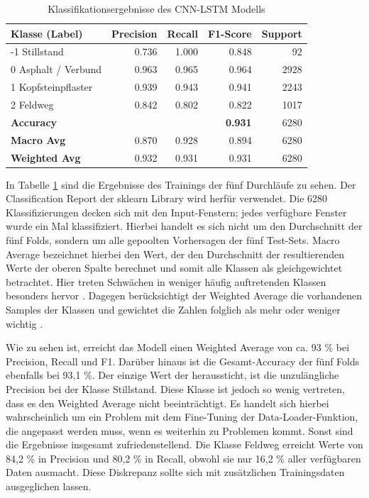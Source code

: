 \begin{table}[hbt!]
    \centering
    \begin{tabular}{lrrrr}
        \hline
        \textbf{Klasse (Label)} & \textbf{Precision} & \textbf{Recall} & \textbf{F1-Score} & \textbf{Support} \\
        \hline
        -1 Stillstand & 0.736 & 1.000 & 0.848 & 92 \\
        0 Asphalt / Verbund & 0.963 & 0.965 & 0.964 & 2928 \\
        1 Kopfsteinpflaster & 0.939 & 0.943 & 0.941 & 2243 \\
        2 Feldweg & 0.842 & 0.802 & 0.822 & 1017 \\
        \hline
        \textbf{Accuracy} & \multicolumn{2}{c}{} & \textbf{0.931} & 6280 \\
        \textbf{Macro Avg} & 0.870 & 0.928 & 0.894 & 6280 \\
        \textbf{Weighted Avg} & 0.932 & 0.931 & 0.931 & 6280 \\
        \hline
    \end{tabular}
    \caption{Klassifikationsergebnisse des CNN-LSTM Modells}
    \label{tab:cnnlstm_results}
\end{table}

In Tabelle \ref{tab:cnnlstm_results} sind die Ergebnisse des Trainings der fünf Durchläufe zu sehen. Der Classification Report der sklearn Library wird herfür verwendet. Die 6280 Klassifizierungen decken sich mit den Input-Fenstern; jedes verfügbare Fenster wurde ein Mal klassifiziert. Hierbei handelt es sich nicht um den Durchschnitt der fünf Folds, sondern um alle gepoolten Vorhersagen der fünf Test-Sets. Macro Average bezeichnet hierbei den Wert, der den Durchschnitt der resultierenden Werte der oberen Spalte berechnet und somit alle Klassen als gleichgewichtet betrachtet. Hier treten Schwächen in weniger häufig auftretenden Klassen besonders hervor \cite{SklearnClassificationReport2026}. Dagegen berücksichtigt der Weighted Average die vorhandenen Samples der Klassen und gewichtet die Zahlen folglich als mehr oder weniger wichtig \cite{SklearnClassificationReport2026}. 

Wie zu sehen ist, erreicht das Modell einen Weighted Average von ca. 93 \% bei Precision, Recall und F1. Darüber hinaus ist die Gesamt-Accuracy der fünf Folds ebenfalls bei 93,1 \%. Der einzige Wert der heraussticht, ist die unzulängliche Precision bei der Klasse Stillstand. Diese Klasse ist jedoch so wenig vertreten, dass es den Weighted Average nicht beeinträchtigt. Es handelt sich hierbei wahrscheinlich um ein Problem mit dem Fine-Tuning der Data-Loader-Funktion, die angepasst werden muss, wenn es weiterhin zu Problemen kommt. Sonst sind die Ergebnisse insgesamt zufriedenstellend. Die Klasse Feldweg erreicht Werte von 84,2 \% in Precision und 80,2 \% in Recall, obwohl sie nur 16,2 \% aller verfügbaren Daten ausmacht. Diese Diskrepanz sollte sich mit zusätzlichen Trainingsdaten ausgeglichen lassen.

